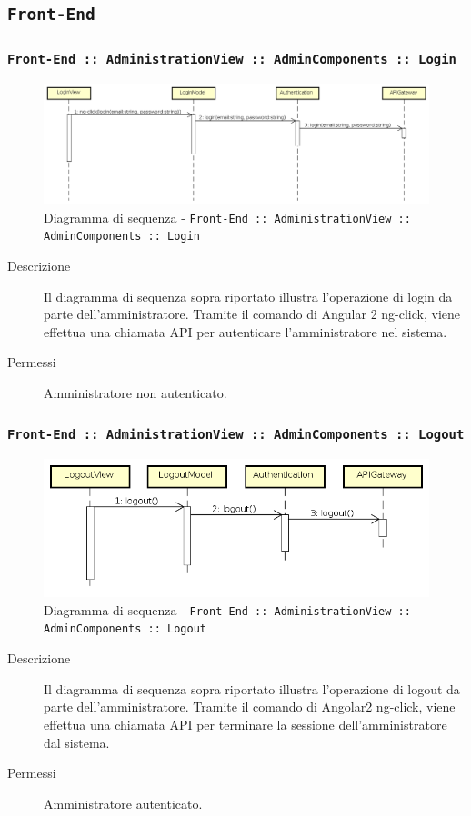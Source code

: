 \documentclass[../DefinizioneDiProdotto_v2.0.0.tex]{subfiles}
\begin{document}
\newpage
\subsection{\texttt{Front-End}}
\subsubsection{\texttt{Front-End :: AdministrationView :: AdminComponents :: Login}}
\begin{figure}[!h]
	\centering
	\includegraphics[scale=0.3]{DiagrammiSequenza/Front-End/AdministrationView/Login.png}
	\caption{Diagramma di sequenza - \texttt{Front-End :: AdministrationView :: AdminComponents :: Login} }
\end{figure}
\begin{description}
	\item [Descrizione] Il diagramma di sequenza sopra riportato illustra l'operazione di login da parte dell'amministratore. Tramite il comando di Angular 2 ng-click, viene effettua una chiamata API per autenticare l'amministratore nel sistema.
	\item [Permessi] Amministratore non autenticato.
\end{description}

\newpage
\subsubsection{\texttt{Front-End :: AdministrationView :: AdminComponents :: Logout}}
\begin{figure}[!h]
	\centering
	\includegraphics[scale=0.3]{DiagrammiSequenza/Front-End/AdministrationView/Logout.png}
	\caption{Diagramma di sequenza - \texttt{Front-End :: AdministrationView :: AdminComponents :: Logout }}
\end{figure}
\begin{description}
	\item [Descrizione] Il diagramma di sequenza sopra riportato illustra l'operazione di logout da parte dell'amministratore. Tramite il comando di Angolar2 ng-click, viene effettua una chiamata API per terminare la sessione dell'amministratore dal sistema.
	\item [Permessi] Amministratore autenticato.
\end{description}
\end{document}
